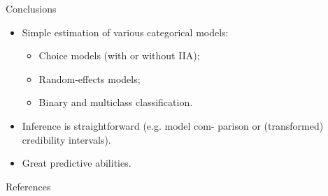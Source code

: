 \documentclass{beamer}
\newlength{\onecolwid}
\newlength{\twocolwid}
\newlength{\threecolwid}
\begin{document}
\begin{frame}[t]
\begin{columns}[t]
\begin{column}{\threecolwid}
\begin{columns}[t,totalwidth=\threecolwid]
\begin{columns}[t,totalwidth=\twocolwid]
\begin{column}{\twocolwid}
\begin{columns}[t,totalwidth=\twocolwid]
\begin{column}{\onecolwid}

\vspace{20pt}
\begin{alertblock}{Conclusions}

\begin{itemize}
  \item Simple estimation of various categorical models:
  \begin{itemize}
    \item Choice models (with or without IIA);
    \item Random-effects models;
    \item Binary and multiclass classification.
  \end{itemize}
  \item Inference is straightforward (e.g. model com- parison or (transformed) credibility intervals).
  \item Great predictive abilities.
\end{itemize}

\end{alertblock}

\vspace{4pt}
\begin{block}{References}

\vspace{-18pt}
\nocite{*}

\small{}


\end{block}
\end{column}
\end{columns}
\end{column}
\end{columns}
\end{columns}
\end{column}
\end{columns}
\end{frame}
\end{document}
